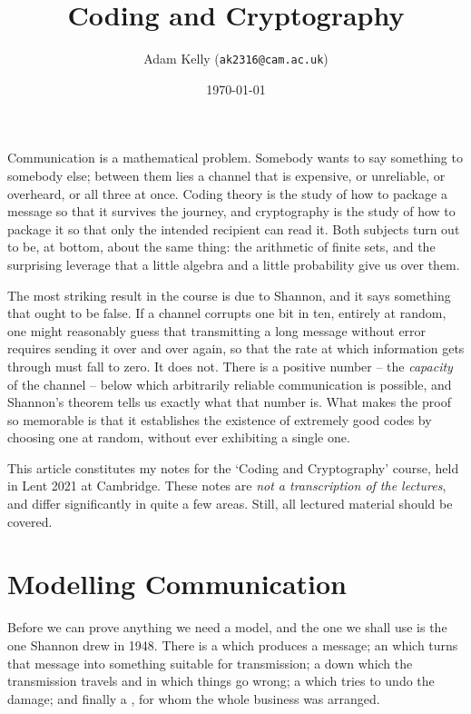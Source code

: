 \documentclass[a4paper]{scrartcl}
\title{Coding and Cryptography}
\author{Adam Kelly (\texttt{ak2316@cam.ac.uk})}
\date{\today}
\begin{document}
\maketitle

Communication is a mathematical problem. Somebody wants to say something to somebody else; between them lies a channel that is expensive, or unreliable, or overheard, or all three at once. Coding theory is the study of how to package a message so that it survives the journey, and cryptography is the study of how to package it so that only the intended recipient can read it. Both subjects turn out to be, at bottom, about the same thing: the arithmetic of finite sets, and the surprising leverage that a little algebra and a little probability give us over them.

The most striking result in the course is due to Shannon, and it says something that ought to be false. If a channel corrupts one bit in ten, entirely at random, one might reasonably guess that transmitting a long message without error requires sending it over and over again, so that the rate at which information gets through must fall to zero. It does not. There is a positive number -- the \emph{capacity} of the channel -- below which arbitrarily reliable communication is possible, and Shannon's theorem tells us exactly what that number is. What makes the proof so memorable is that it establishes the existence of extremely good codes by choosing one at random, without ever exhibiting a single one.

This article constitutes my notes for the `Coding and Cryptography' course, held in Lent 2021 at Cambridge. These notes are \emph{not a transcription of the lectures}, and differ significantly in quite a few areas. Still, all lectured material should be covered.

\tableofcontents

\section{Modelling Communication}

Before we can prove anything we need a model, and the one we shall use is the one Shannon drew in 1948. There is a  which produces a message; an  which turns that message into something suitable for transmission; a  down which the transmission travels and in which things go wrong; a  which tries to undo the damage; and finally a , for whom the whole business was arranged.
\end{document}

